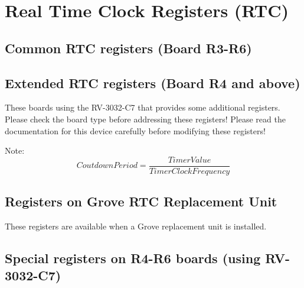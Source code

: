 \chapter{Real Time Clock Registers (RTC)}

\section{Common RTC registers (Board R3-R6)}


\section{Extended RTC registers (Board R4 and above)}
These boards using the RV-3032-C7 that provides some additional registers. Please check the board type before addressing these registers!
Please read the documentation for this device carefully before modifying these registers!



Note:
\begin{equation}
Coutdown Period = \frac{Timer Value}{Timer Clock Frequency}
\end{equation}


\section{Registers on Grove RTC Replacement Unit}
These registers are available when a Grove replacement unit
is installed.



\section{ Special registers on R4-R6 boards (using RV-3032-C7)}


